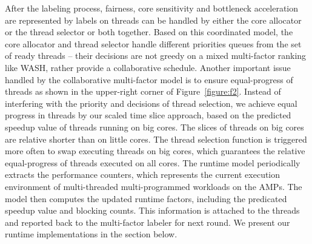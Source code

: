 
After the labeling process, fairness, core sensitivity and bottleneck acceleration are represented by labels on threads can be handled by either the core allocator or the thread selector or both together. Based on this coordinated model, the core allocator and thread selector handle different priorities queues from the set of ready threads -- their decisions are not greedy on a mixed multi-factor ranking like WASH, rather provide a collaborative schedule.
Another important issue handled by the collaborative multi-factor model is to ensure equal-progress of threads as shown in the upper-right corner of Figure~\ref{figure:f2}. Instead of interfering with the priority and decisions of thread selection, we achieve equal progress in threads by our scaled time slice approach, based on the predicted speedup value of threads running on big cores. The slices of threads on big cores are relative shorter than on little cores. The thread selection function is triggered more often to swap executing threads on big cores, which guarantees the relative equal-progress of threads executed on all cores.
The runtime model periodically extracts the performance counters, which represents the current execution environment of multi-threaded multi-programmed workloads on the AMPs. The model then computes the updated runtime factors, including the predicated speedup value and blocking counts. This information is attached to the threads and reported back to the multi-factor labeler for next round. We present our runtime implementations in the section below. 



